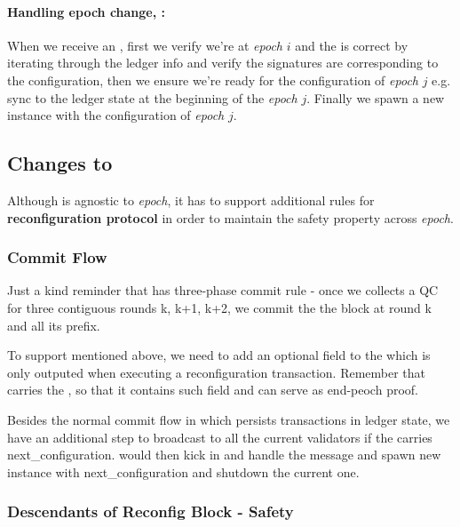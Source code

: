 \paragraph{Handling epoch change, :}

When we receive an , first we verify we're at \emph{epoch} $i$ and the  is correct by iterating through the
ledger info and verify the signatures are corresponding to the configuration, then we ensure we're ready for the configuration of \emph{epoch}
$j$ e.g. sync to the ledger state at the beginning of the \emph{epoch} $j$. Finally we spawn a new \LBFT instance with
 the configuration of \emph{epoch} $j$.

\subsection{Changes to \LBFT}

Although \LBFT is agnostic to \emph{epoch}, it has to support additional rules for \textbf{reconfiguration protocol} in order to
maintain the safety property across \emph{epoch}.

\subsubsection{Commit Flow}
Just a kind reminder that \LBFT has three-phase commit rule - once we collects a QC for three contiguous rounds k, k+1, k+2, we commit the the block at round k
and all its prefix.

To support  mentioned above, we need to add an optional field  to the 
which is only outputed when executing a reconfiguration transaction. Remember that  carries the ,
so that it contains such field and can serve as end-peoch proof.

Besides the normal commit flow in \LBFT which persists transactions in ledger state, we have an additional step to broadcast
 to all the current validators if the  carries next\_configuration. 
would then kick in and handle the  message and spawn new \LBFT instance with next\_configuration and shutdown the current one.

\subsubsection{Descendants of Reconfig Block - Safety} \label{safety}

